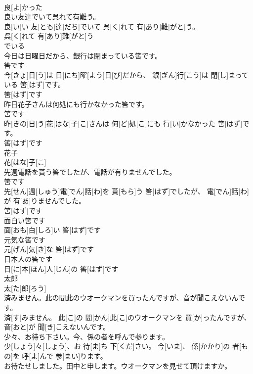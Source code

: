 \documentclass[8pt]{extreport}
\begin{document}
\begin{CJK}{UTF8}{min}
\\	良[よ]かった 
\\	良い友達でいて呉れて有難う。	
\\	良[い]い 友[とも]達[だち]でいて 呉[く]れて 有[あり]難[がと]う。 
\\	呉[く]れて 有[あり]難[がと]う 
\\	でいる 
\\	今日は日曜日だから、銀行は閉まっている筈です。 
\\	筈です 
\\	今[きょ]日[う]は 日[にち]曜[よう]日[び]だから、 銀[ぎん]行[こう]は 閉[し]まっている 筈[はず]です。 
\\	筈[はず]です 
\\	昨日花子さんは何処にも行かなかった筈です。 
\\	筈です 
\\	昨[きの]日[う]花[はな]子[こ]さんは 何[ど]処[こ]にも 行[い]かなかった 筈[はず]です。 
\\	筈[はず]です 
\\	花子	
\\	花[はな]子[こ]	
\\	先週電話を貰う筈でしたが、電話が有りませんでした。 
\\	筈です 
\\	先[せん]週[しゅう]電[でん]話[わ]を 貰[もら]う 筈[はず]でしたが、 電[でん]話[わ]が 有[あ]りませんでした。 
\\	筈[はず]です 
\\	面白い筈です	
\\	面[おも]白[しろ]い 筈[はず]です
\\	元気な筈です	
\\	元[げん]気[き]な 筈[はず]です
\\	日本人の筈です	
\\	日[に]本[ほん]人[じん]の 筈[はず]です
\\	太郎	
\\	太[た]郎[ろう]	
\\	済みません。此の間此のウオークマンを買ったんですが、音が聞こえないんです。	
\\	済[す]みません。 此[こ]の 間[かん]此[こ]のウオークマンを 買[か]ったんですが、 音[おと]が 聞[き]こえないんです。
\\	少々、お待ち下さい。今、係の者を呼んで参ります。	
\\	少[しょう]々[しょう]、お 待[ま]ち 下[くだ]さい。 今[いま]、 係[かかり]の 者[もの]を 呼[よ]んで 参[まい]ります。
\\	お待たせしました。田中と申します。ウオークマンを見せて頂けますか。	

\end{CJK}
\end{document}
